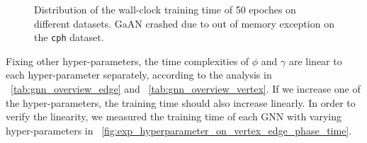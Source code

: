 \begin{figure}
    \caption{Distribution of the wall-clock training time of 50 epoches on different datasets. GaAN crashed due to out of memory exception on the \texttt{cph} dataset.}
    \label{fig:exp_absolute_training_time}
\end{figure}

Fixing other hyper-parameters, the time complexities of $\phi$ and $\gamma$ are linear to each hyper-parameter separately, according to the analysis in \tablename~\ref{tab:gnn_overview_edge} and \tablename~\ref{tab:gnn_overview_vertex}.
If we increase one of the hyper-parameters, the training time should also increase linearly.
In order to verify the linearity, we measured the training time of each GNN with varying hyper-parameters in \figurename~\ref{fig:exp_hyperparameter_on_vertex_edge_phase_time}.

